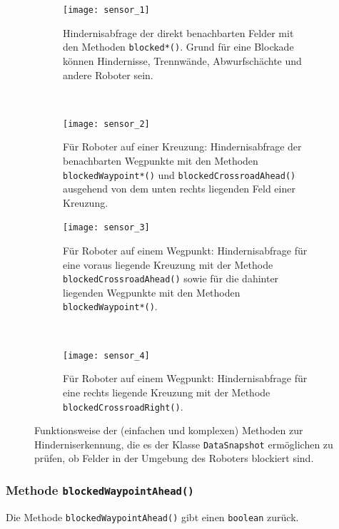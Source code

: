 \begin{figure}[h]
	\centering
	\begin{subfigure}[b]{0.45\textwidth}
		\centering
		\texttt{[image: sensor\_1]}
		\caption{Hindernisabfrage der direkt benachbarten Felder mit den Methoden \texttt{blocked*()}. Grund für eine Blockade können Hindernisse, Trennwände, Abwurfschächte und andere Roboter sein.}
		\label{fig:sensor_1}
	\end{subfigure}
	~~~~~
	\begin{subfigure}[b]{0.45\textwidth}
		\centering
		\texttt{[image: sensor\_2]}
		\caption{Für Roboter auf einer Kreuzung: Hindernisabfrage der benachbarten Wegpunkte mit den Methoden \texttt{blockedWaypoint*()} und \texttt{blockedCrossroadAhead()} ausgehend von dem unten rechts liegenden Feld einer Kreuzung.}
		\label{fig:sensor_2}
	\end{subfigure}
	\begin{subfigure}[b]{0.45\textwidth}
		\centering
		\vspace{1cm}
		\texttt{[image: sensor\_3]}
		\caption{Für Roboter auf einem Wegpunkt: Hindernisabfrage für eine voraus liegende Kreuzung mit der Methode \texttt{blockedCrossroadAhead()} sowie für die dahinter liegenden Wegpunkte mit den Methoden \texttt{blockedWaypoint*()}.}
		\label{fig:sensor_3}
	\end{subfigure}
	~~~~~
	\begin{subfigure}[b]{0.45\textwidth}
		\centering
		\vspace{1cm}
		\texttt{[image: sensor\_4]}
		\caption{Für Roboter auf einem Wegpunkt: Hindernisabfrage für eine rechts liegende Kreuzung mit der Methode \texttt{blockedCrossroadRight()}.} %
		\label{fig:sensor_4}
		\vfill{}
	\end{subfigure}
	\caption{Funktionsweise der (einfachen und komplexen) Methoden zur Hinderniserkennung, die es der Klasse \texttt{DataSnapshot} ermöglichen zu prüfen, ob Felder in der Umgebung des Roboters blockiert sind.}
	\label{fig:sensor}
\end{figure}

\clearpage

\subsubsection{Methode \texttt{blockedWaypointAhead()}}

Die Methode \texttt{blockedWaypointAhead()} gibt einen \texttt{boolean} zurück.

